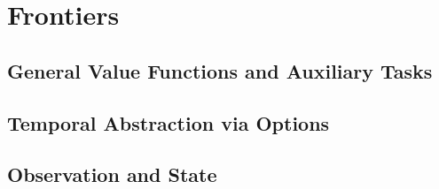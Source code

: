 \documentclass[sutton_barto_notes.tex]{subfiles}
\begin{document}
\newpage
\section{Frontiers}

\subsection{General Value Functions and Auxiliary Tasks}

\subsection{Temporal Abstraction via Options}

\subsection{Observation and State}
\end{document}
